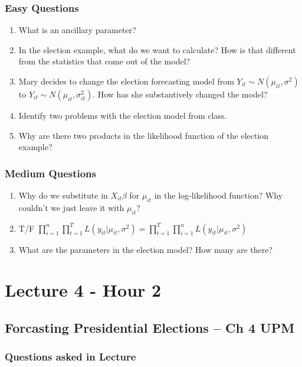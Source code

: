 \documentclass[11pt]{article}
\begin{document}
\subsubsection{Easy Questions}
\begin{enumerate}
\item What is an ancillary parameter? 
\item In the election example, what do we want to calculate?  How is that different from the statistics that come out of the model?  
\item Mary decides to change the election forecasting model from $Y_{it} \sim N(\mu_{it}, \sigma^2)$ to $Y_{it} \sim N(\mu_{it}, \sigma_{it}^2)$.  How has she substantively changed the model? 
\item Identify two problems with the election model from class. 
\item Why are there two products in the likelihood function of the election example?   
\end{enumerate}

\subsubsection{Medium Questions}
\begin{enumerate}
\item Why do we substitute in $X_{it}\beta$ for $\mu_{it}$ in the log-likelihood function?  Why couldn't we just leave it with $\mu_{it}$?  
\item T/F $\prod_{i=1}^n\prod_{t=1}^T L(y_{it}|\mu_{it}, \sigma^2) = \prod_{t=1}^T\prod_{i=1}^nL(y_{it}|\mu_{it}, \sigma^2)$ 
\item What are the parameters in the election model?  How many are there? 
\end{enumerate}

\section{Lecture 4 - Hour 2}

\subsection{Forcasting Presidential Elections -- Ch 4 UPM}

\subsubsection{Questions asked in Lecture}
\end{document}
